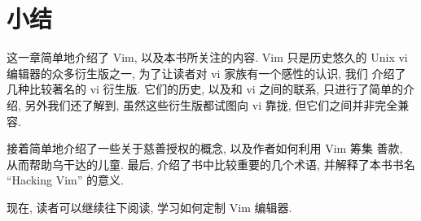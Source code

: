 \section{小结}
\label{sec:getting_started_with_vim_summary}
这一章简单地介绍了 Vim, 以及本书所关注的内容. Vim 只是历史悠久的 Unix
vi 编辑器的众多衍生版之一, 为了让读者对 vi 家族有一个感性的认识, 我们
介绍了几种比较著名的 vi 衍生版. 它们的历史, 以及和 vi 之间的联系,
只进行了简单的介绍, 另外我们还了解到, 虽然这些衍生版都试图向 vi 靠拢,
但它们之间并非完全兼容.

接着简单地介绍了一些关于慈善授权的概念, 以及作者如何利用 Vim 筹集
善款, 从而帮助乌干达的儿童. 最后, 介绍了书中比较重要的几个术语,
并解释了本书书名 ``Hacking Vim'' 的意义.

现在, 读者可以继续往下阅读, 学习如何定制 Vim 编辑器.
